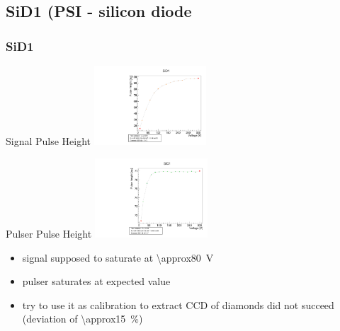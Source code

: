 \documentclass[9pt]{beamer}
\begin{document}
\subsection{SiD1 (PSI - silicon diode}
\begin{frame}
	\frametitle{SiD1}
	\def \sp {4.2cm}
	\begin{minipage}{5.5cm}
		\centering
		Signal Pulse Height
		\includegraphics[angle=270, width=\sp]{PVS19}
	\end{minipage}
	\hspace*{2pt}
	\begin{minipage}{5.5cm}
		\centering
		Pulser Pulse Height
		\includegraphics[angle=270, width=\sp]{SVC19}
	\end{minipage}\s
	\begin{itemize}
		\item signal supposed to saturate at \SI{\approx80}{V}
		\item pulser saturates at expected value
		\item try to use it as calibration to extract CCD of diamonds did not succeed (deviation of \SI{\approx15}{\%})
	\end{itemize}
\end{frame}
\end{document}
